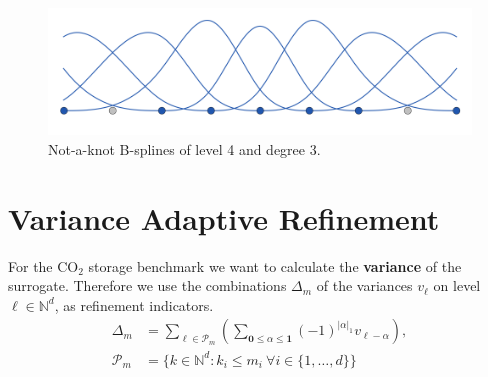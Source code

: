 \documentclass[final,hyperref={pdfpagelabels=false},table]{beamer}
\begin{document}
\begin{frame}
\begin{columns}[T]
\begin{column}{\colCWidth}
\begin{figure}[h]
\includegraphics[]{nakBsplineBasis_33.png}
\caption{Not-a-knot B-splines of level 4 and degree 3.}
\end{figure}


\section{Variance Adaptive Refinement}
For the CO$_2$ storage benchmark we want to calculate the \textbf{variance} of the surrogate. Therefore we use the combinations $\Delta_m$ of the variances $v_\ell$ on level $\ell\in\mathbb{N}^d$, as refinement indicators.
\begin{align*}
\Delta_m &= \sum_{\ell \in \mathcal{P}_m} \left( \sum_{ \textbf{0} \leq\alpha \leq \textbf{1}} (-1)^{ \vert \alpha \vert_1}  		v_{\ell - \alpha}\right),\\ \mathcal{P}_m &= \lbrace k \in \mathbb{N}^d: k_i \leq m_i\ \forall i\in \lbrace 1,\dots,d\rbrace\rbrace
\end{align*}



\end{column}
\end{columns}
\end{frame}
\end{document}
